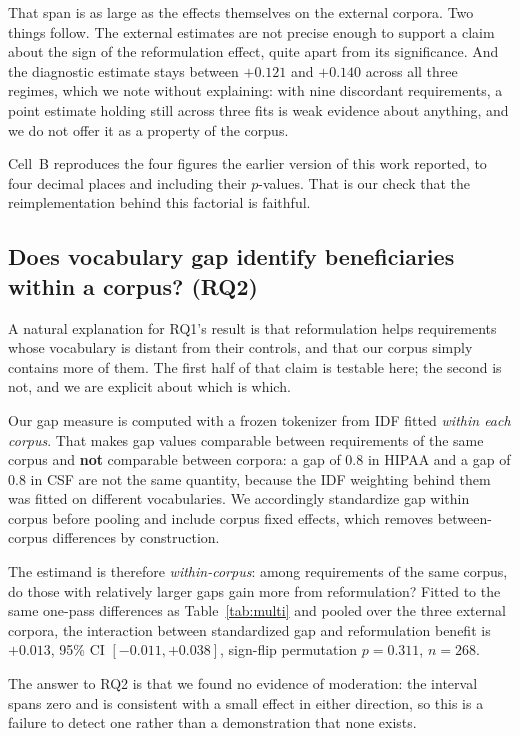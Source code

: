 \documentclass[smallextended,natbib]{svjour3}
\begin{document}
That span is as large as the effects themselves on the external corpora. Two things follow. The external estimates are not precise enough to support a claim about the sign of the reformulation effect, quite apart from its significance. And the diagnostic estimate stays between $+0.121$ and $+0.140$ across all three regimes, which we note without explaining: with nine discordant requirements, a point estimate holding still across three fits is weak evidence about anything, and we do not offer it as a property of the corpus.

Cell~B reproduces the four figures the earlier version of this work reported, to four decimal places and including their $p$-values. That is our check that the reimplementation behind this factorial is faithful.

\subsection{Does vocabulary gap identify beneficiaries within a corpus? (RQ2)}
\label{sec:results-gap}

A natural explanation for RQ1's result is that reformulation helps requirements whose vocabulary is distant from their controls, and that our corpus simply contains more of them. The first half of that claim is testable here; the second is not, and we are explicit about which is which.

Our gap measure is computed with a frozen tokenizer from IDF fitted \emph{within each corpus}. That makes gap values comparable between requirements of the same corpus and \textbf{not} comparable between corpora: a gap of $0.8$ in HIPAA and a gap of $0.8$ in CSF are not the same quantity, because the IDF weighting behind them was fitted on different vocabularies. We accordingly standardize gap within corpus before pooling and include corpus fixed effects, which removes between-corpus differences by construction.

The estimand is therefore \emph{within-corpus}: among requirements of the same corpus, do those with relatively larger gaps gain more from reformulation? Fitted to the same one-pass differences as Table~\ref{tab:multi} and pooled over the three external corpora, the interaction between standardized gap and reformulation benefit is $+0.013$, 95\% CI $[-0.011, +0.038]$, sign-flip permutation $p = 0.311$, $n = 268$.

The answer to RQ2 is that we found no evidence of moderation: the interval spans zero and is consistent with a small effect in either direction, so this is a failure to detect one rather than a demonstration that none exists.
\end{document}
